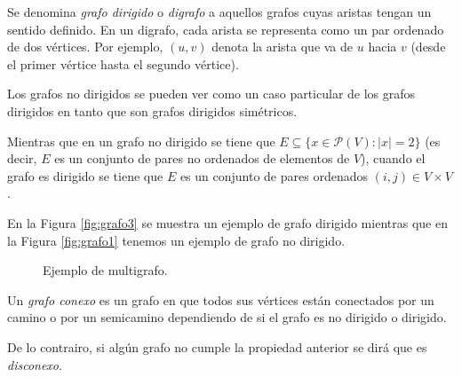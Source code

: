 \begin{definition}
Se denomina \emph{grafo dirigido} o \emph{digrafo} a aquellos grafos cuyas aristas tengan un sentido definido. En un digrafo, cada arista se representa como un par ordenado de dos vértices. Por ejemplo, $(u,v)$ denota la arista que va de $u$ hacia $v$ (desde el primer vértice hasta el segundo vértice).

Los grafos no dirigidos se pueden ver como un caso particular de los grafos dirigidos en tanto que son grafos dirigidos simétricos.

Mientras que en un grafo no dirigido se tiene que $E \subseteq \{x \in \mathcal{P}(V) : |x| = 2\}$ (es decir, $E$ es un conjunto de pares no ordenados de elementos de $V$), cuando el grafo es dirigido se tiene que $E$ es un conjunto de pares ordenados $(i,j) \in V \times V$.
\end{definition}

\begin{exampleth}
En la Figura \ref{fig:grafo3} se muestra un ejemplo de grafo dirigido mientras que en la Figura \ref{fig:grafo1} tenemos un ejemplo de grafo no dirigido.
\end{exampleth}

\begin{figure}[H]
    \centering
{}
	\caption{Ejemplo de multigrafo.}
	\label{fig:grafo4}
\end{figure}

\begin{definition}
Un \emph{grafo conexo} es un grafo en que todos sus vértices están conectados por un camino o por un semicamino dependiendo de si el grafo es no dirigido o dirigido.

De lo contrairo, si algún grafo no cumple la propiedad anterior se dirá que es \emph{disconexo}.
\end{definition}


